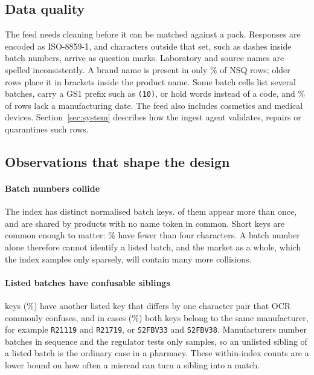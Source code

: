 \subsection{Data quality}
The feed needs cleaning before it can be matched against a pack. Responses are encoded as ISO-8859-1, and characters outside that set, such as dashes inside batch numbers, arrive as question marks. Laboratory and source names are spelled inconsistently. A brand name is present in only \BrandPresentPct\% of NSQ rows; older rows place it in brackets inside the product name. Some batch cells list several batches, carry a GS1 prefix such as \texttt{(10)}, or hold words instead of a code, and \MissingDatePct\% of rows lack a manufacturing date. The feed also includes cosmetics and medical devices. Section~\ref{sec:system} describes how the ingest agent validates, repairs or quarantines such rows.

\subsection{Observations that shape the design}
\paragraph{Batch numbers collide}
The index has \DistinctKeys{} distinct normalised batch keys. \RepeatedKeys{} of them appear more than once, and \CollisionKeys{} are shared by products with no name token in common. Short keys are common enough to matter: \ShortKeyPct\% have fewer than four characters. A batch number alone therefore cannot identify a listed batch, and the market as a whole, which the index samples only sparsely, will contain many more collisions.

\paragraph{Listed batches have confusable siblings}
\NeighbourKeys{} keys (\NeighbourKeysPct\%) have another listed key that differs by one character pair that OCR commonly confuses, and in \SiblingKeys{} cases (\SiblingKeysPct\%) both keys belong to the same manufacturer, for example \texttt{R21119} and \texttt{R21719}, or \texttt{S2FBV33} and \texttt{S2FBV38}. Manufacturers number batches in sequence and the regulator tests only samples, so an unlisted sibling of a listed batch is the ordinary case in a pharmacy. These within-index counts are a lower bound on how often a misread can turn a sibling into a match.

